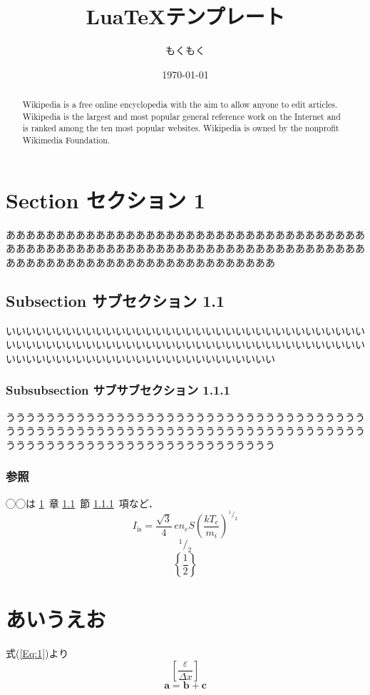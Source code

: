\documentclass[10pt,a4paper]{ltjsarticle}       %
\title{Lua\TeX テンプレート}
\author{もくもく}
\date{\today}
\newcommand*{\refSec}[1]{\ref{#1}~章}           %
\newcommand*{\refSsec}[1]{\ref{#1}~節}          %
\newcommand*{\refSssec}[1]{\ref{#1}~項}         %
\newcommand*{\refEq}[1]{式(\ref{#1})}           %
\newcommand{\vDel}{\varDelta}                   %
\newcommand{\veps}{\varepsilon}                 %
\newcommand*{\paren}[1]{\left( #1 \right)}      %
\newcommand*{\curly}[1]{\left\{ #1 \right\}}    %
\newcommand*{\bracket}[1]{\left[ #1 \right]}    %
\newcommand*\sfrac[2]{{}^{#1}\!/_{#2}}          %
\renewcommand*\vec[1]{\mathbf{#1}}              %
\begin{document}
\maketitle
\thispagestyle{fancy}

\begin{abstract}
Wikipedia is a free online encyclopedia with the aim to allow anyone to edit articles. Wikipedia is the largest and most popular general reference work on the Internet and is ranked among the ten most popular websites. Wikipedia is owned by the nonprofit Wikimedia Foundation.
\end{abstract}

\tableofcontents
\clearpage

\section{Section セクション 1} \label{Sec:1}
あああああああああああああああああああああああああああああああああああああああああああああああああああああああああああああああああああああああああああああああああああああああああああああああああああ

\subsection{Subsection サブセクション 1.1} \label{Ssec:1}
いいいいいいいいいいいいいいいいいいいいいいいいいいいいいいいいいいいいいいいいいいいいいいいいいいいいいいいいいいいいいいいいいいいいいいいいいいいいいいいいいいいいいいいいいいいいいいいいいいい

\subsubsection{Subsubsection サブサブセクション 1.1.1} \label{Sssec:1}
ううううううううううううううううううううううううううううううううううううううううううううううううううううううううううううううううううううううううううううううううううううううううううううううううううう

\subsubsection{参照}
◯◯は \refSec{Sec:1} \refSsec{Ssec:1} \refSssec{Sssec:1}など．
\begin{equation} \label{Eq:1}
  I_{\mathrm{is}} = \dfrac{\sqrt{3}}{4} \, en_{e} S \paren{\dfrac{kT_{e}}{m_{i}}}^{\sfrac{1}{2}}
\end{equation}
\begin{equation}
  \sfrac{1}{2}
\end{equation}
\begin{equation}
  \curly{\dfrac{1}{2}}
\end{equation}

\section{あいうえお}
\refEq{Eq:1}より
\begin{equation}
  \bracket{\dfrac{\veps}{\vDel x}}
\end{equation}
\begin{equation}
  \vec{a} = \vec{b} + \vec{c}
\end{equation}
\end{document}
